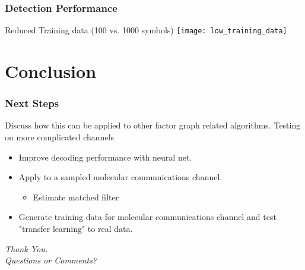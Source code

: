 \documentclass[10pt,tgadventor, onlymath]{beamer}
\begin{document}
\begin{frame}
\frametitle{Detection Performance}
	Reduced Training data (100 vs. 1000 symbols)
	\texttt{[image: low\_training\_data]}
\end{frame}


\section{Conclusion}


\begin{frame}
\frametitle{Next Steps}
Discuss how this can be applied to other factor graph related algorithms. 
Testing on more complicated channels
\begin{itemize}
\item Improve decoding performance with neural net.
\item Apply to a sampled molecular communications channel.
\begin{itemize}
\item Estimate matched filter
\end{itemize}
\item Generate training data for molecular communications channel and test "transfer learning" to real data.
\end{itemize}
\end{frame}

\begin{frame}
  \centering \Large
  \emph{Thank You.}
  \\
	\bigskip
    \centering \Large
  \emph{Questions or Comments?}

\end{frame}
\end{document}

